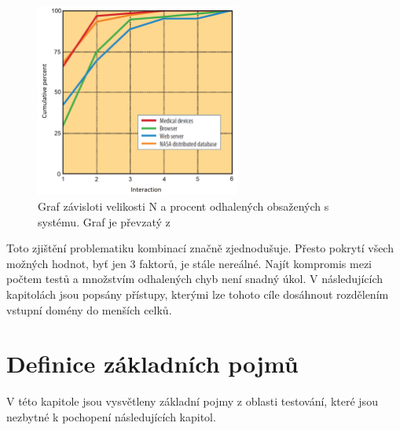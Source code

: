 \begin{figure}[hbt]
	\centering
	\includegraphics[width=0.6\textwidth]{obrazky-figures/Fault_graph2.png}
	\caption{Graf závisloti velikosti N a procent odhalených obsažených s systému. Graf je převzatý z \cite{4_IntroductionToCombinatorialTesting}}
	\label{fig_faultGraph}
\end{figure}

Toto zjištění problematiku kombinací značně zjednodušuje. Přesto pokrytí všech možných hodnot, byť jen 3 faktorů, je stále nereálné. Najít kompromis mezi počtem testů a množstvím odhalených chyb není snadný úkol. V následujících kapitolách jsou popsány přístupy, kterými lze tohoto cíle dosáhnout rozdělením vstupní domény do menších celků. 



\section{Definice základních pojmů}
\label{sec_definiceZakladnichPojmu}

V této kapitole jsou vysvětleny základní pojmy z oblasti testování, které jsou nezbytné k pochopení následujících kapitol. 


